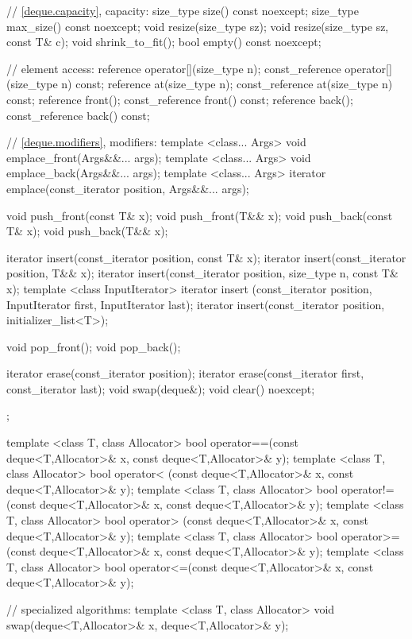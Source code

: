 \begin{codeblock}
{{    // \ref{deque.capacity}, capacity:
    size_type size() const noexcept;
    size_type max_size() const noexcept;
    void      resize(size_type sz);
    void      resize(size_type sz, const T& c);
    void      shrink_to_fit();
    bool      empty() const noexcept;

    // element access:
    reference       operator[](size_type n);
    const_reference operator[](size_type n) const;
    reference       at(size_type n);
    const_reference at(size_type n) const;
    reference       front();
    const_reference front() const;
    reference       back();
    const_reference back() const;

    // \ref{deque.modifiers}, modifiers:
    template <class... Args> void emplace_front(Args&&... args);
    template <class... Args> void emplace_back(Args&&... args);
    template <class... Args> iterator emplace(const_iterator position, Args&&... args);

    void push_front(const T& x);
    void push_front(T&& x);
    void push_back(const T& x);
    void push_back(T&& x);

    iterator insert(const_iterator position, const T& x);
    iterator insert(const_iterator position, T&& x);
    iterator insert(const_iterator position, size_type n, const T& x);
    template <class InputIterator>
      iterator insert (const_iterator position, InputIterator first, InputIterator last);
    iterator insert(const_iterator position, initializer_list<T>);

    void pop_front();
    void pop_back();

    iterator erase(const_iterator position);
    iterator erase(const_iterator first, const_iterator last);
    void     swap(deque&);
    void     clear() noexcept;
  };

  template <class T, class Allocator>
    bool operator==(const deque<T,Allocator>& x, const deque<T,Allocator>& y);
  template <class T, class Allocator>
    bool operator< (const deque<T,Allocator>& x, const deque<T,Allocator>& y);
  template <class T, class Allocator>
    bool operator!=(const deque<T,Allocator>& x, const deque<T,Allocator>& y);
  template <class T, class Allocator>
    bool operator> (const deque<T,Allocator>& x, const deque<T,Allocator>& y);
  template <class T, class Allocator>
    bool operator>=(const deque<T,Allocator>& x, const deque<T,Allocator>& y);
  template <class T, class Allocator>
    bool operator<=(const deque<T,Allocator>& x, const deque<T,Allocator>& y);

  // specialized algorithms:
  template <class T, class Allocator>
    void swap(deque<T,Allocator>& x, deque<T,Allocator>& y);
}
\end{codeblock}


